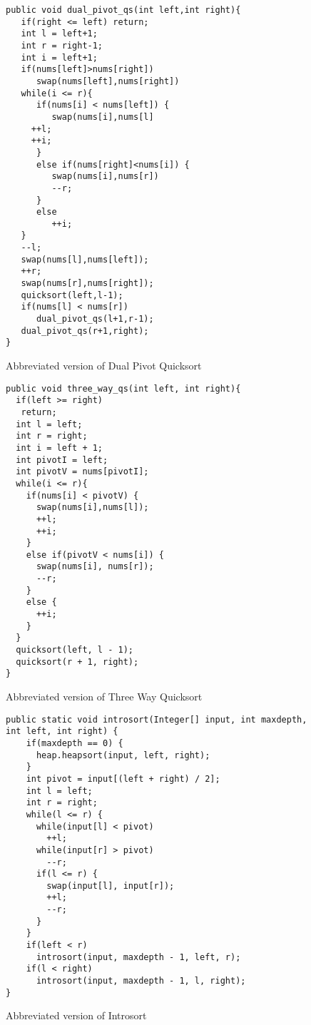 \documentclass{article}
\begin{document}
\begin{figure}
\begin{lstlisting}
public void dual_pivot_qs(int left,int right){
   if(right <= left) return;
   int l = left+1;
   int r = right-1;
   int i = left+1;
   if(nums[left]>nums[right])
      swap(nums[left],nums[right])
   while(i <= r){
      if(nums[i] < nums[left]) {
         swap(nums[i],nums[l]
	 ++l;
	 ++i;
      }
      else if(nums[right]<nums[i]) {
         swap(nums[i],nums[r])
         --r;
      }
      else
         ++i;
   }
   --l;
   swap(nums[l],nums[left]);
   ++r;
   swap(nums[r],nums[right]);
   quicksort(left,l-1);
   if(nums[l] < nums[r])
      dual_pivot_qs(l+1,r-1);
   dual_pivot_qs(r+1,right);
}
\end{lstlisting}
\caption{Abbreviated version of Dual Pivot Quicksort}
\label{code-dualpivot}
\end{figure}

\begin{figure}
\begin{lstlisting}
public void three_way_qs(int left, int right){
  if(left >= right)
   return;
  int l = left;
  int r = right;
  int i = left + 1;		
  int pivotI = left;
  int pivotV = nums[pivotI];
  while(i <= r){
    if(nums[i] < pivotV) {
      swap(nums[i],nums[l]);
      ++l;
      ++i;
    }
    else if(pivotV < nums[i]) {
      swap(nums[i], nums[r]);
      --r;
    }
    else { 
      ++i;
    }
  }
  quicksort(left, l - 1);
  quicksort(r + 1, right);
}
\end{lstlisting}
\caption{Abbreviated version of Three Way Quicksort}
\label{code-threeway}
\end{figure}

\begin{figure}
\begin{lstlisting}
public static void introsort(Integer[] input, int maxdepth, int left, int right) {
    if(maxdepth == 0) {
      heap.heapsort(input, left, right);
    }
    int pivot = input[(left + right) / 2];
    int l = left;
    int r = right;
    while(l <= r) {
      while(input[l] < pivot)
        ++l;
      while(input[r] > pivot)
        --r;
      if(l <= r) {
        swap(input[l], input[r]);
        ++l;
        --r;
      }
    }
    if(left < r)
      introsort(input, maxdepth - 1, left, r);
    if(l < right)
      introsort(input, maxdepth - 1, l, right);
}
\end{lstlisting}
\caption{Abbreviated version of Introsort}
\label{code-introsort}
\end{figure}
\end{document}
